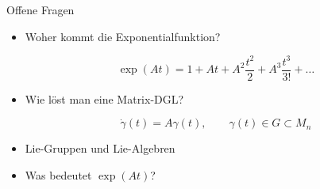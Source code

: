 %
%
%
\bgroup



\begin{frame}[t]
  \setlength{\abovedisplayskip}{5pt}
  \setlength{\belowdisplayskip}{5pt}
  \begin{block}{Offene Fragen}
    \begin{itemize}[<+->]
      \item Woher kommt die Exponentialfunktion?
      \begin{fleqn} 
        \[
        \exp(At)
        =
        1 
        + At 
        + A^2\frac{t^2}{2}
        + A^3\frac{t^3}{3!} 
        + \ldots
        \]
      \end{fleqn}
      \item Wie löst man eine Matrix-DGL?
      \begin{fleqn} 
        \[ 
        \dot\gamma(t) = A\gamma(t),
        \qquad
        \gamma(t) \in G \subset M_n
        \]
      \end{fleqn}
      \item Lie-Gruppen und Lie-Algebren
      \item Was bedeutet $\exp(At)$?
    \end{itemize}
  \end{block}
\end{frame}

\egroup
